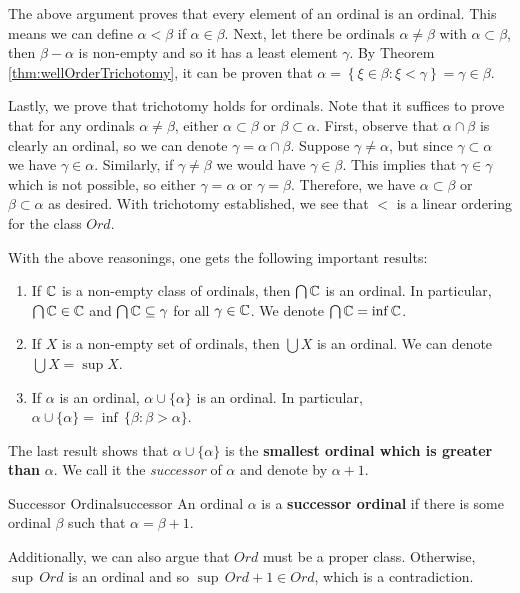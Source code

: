 \documentclass[math]{amznotes}
\theoremstyle{remark}
\begin{document}
The above argument proves that every element of an ordinal is an ordinal. This means we can define $\alpha < \beta$ if $\alpha \in \beta$. Next, let there be ordinals $\alpha \neq \beta$ with $\alpha \subset \beta$, then $\beta - \alpha$ is non-empty and so it has a least element $\gamma$. By Theorem \ref{thm:wellOrderTrichotomy}, it can be proven that $\alpha = \left\{\xi \in \beta \colon \xi < \gamma\right\} = \gamma \in \beta$.

Lastly, we prove that trichotomy holds for ordinals. Note that it suffices to prove that for any ordinals $\alpha \neq \beta$, either $\alpha \subset \beta$ or $\beta \subset \alpha$. First, observe that $\alpha \cap \beta$ is clearly an ordinal, so we can denote $\gamma = \alpha \cap \beta$. Suppose $\gamma \neq \alpha$, but since $\gamma \subset \alpha$ we have $\gamma \in \alpha$. Similarly, if $\gamma \neq \beta$ we would have $\gamma \in \beta$. This implies that $\gamma \in \gamma$ which is not possible, so either $\gamma = \alpha$ or $\gamma = \beta$. Therefore, we have $\alpha \subset \beta$ or $\beta \subset \alpha$ as desired. With trichotomy established, we see that $<$ is a linear ordering for the class $Ord$.

With the above reasonings, one gets the following important results:
\begin{enumerate}
    \item If $\mathbb{C}$ is a non-empty class of ordinals, then $\bigcap\mathbb{C}$ is an ordinal. In particular, $\bigcap\mathbb{C} \in \mathbb{C}$ and $\bigcap\mathbb{C} \subseteq \gamma$ for all $\gamma \in \mathbb{C}$. We denote $\bigcap\mathbb{C} = \inf\mathbb{C}$.
    \item If $X$ is a non-empty set of ordinals, then $\bigcup X$ is an ordinal. We can denote $\bigcup X = \sup X$.
    \item If $\alpha$ is an ordinal, $\alpha \cup \{\alpha\}$ is an ordinal. In particular, $\alpha \cup \{\alpha\} = \inf\,\{\beta \colon \beta > \alpha\}$.
\end{enumerate}
The last result shows that $\alpha \cup \{\alpha\}$ is the \textbf{smallest ordinal which is greater than} $\alpha$. We call it the \textit{successor} of $\alpha$ and denote by $\alpha + 1$.
\begin{dfnbox}{Successor Ordinal}{successor}
    An ordinal $\alpha$ is a {\color{red} \textbf{successor ordinal}} if there is some ordinal $\beta$ such that $\alpha = \beta + 1$.
\end{dfnbox}
Additionally, we can also argue that $Ord$ must be a proper class. Otherwise, $\sup\,Ord$ is an ordinal and so $\sup\,Ord + 1 \in Ord$, which is a contradiction.
\end{document}
